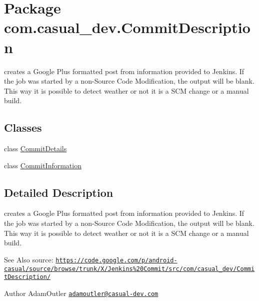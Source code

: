 \hypertarget{namespacecom_1_1casual__dev_1_1_commit_description}{\section{Package com.\-casual\-\_\-dev.\-Commit\-Description}
\label{namespacecom_1_1casual__dev_1_1_commit_description}
}


creates a Google Plus formatted post from information provided to Jenkins. If the job was started by a non-\/\-Source Code Modification, the output will be blank. This way it is possible to detect weather or not it is a S\-C\-M change or a manual build.  


\subsection*{Classes}
\begin{DoxyCompactItemize}
\item 
class \hyperlink{classcom_1_1casual__dev_1_1_commit_description_1_1_commit_details}{Commit\-Details}
\item 
class \hyperlink{classcom_1_1casual__dev_1_1_commit_description_1_1_commit_information}{Commit\-Information}
\end{DoxyCompactItemize}


\subsection{Detailed Description}
creates a Google Plus formatted post from information provided to Jenkins. If the job was started by a non-\/\-Source Code Modification, the output will be blank. This way it is possible to detect weather or not it is a S\-C\-M change or a manual build. \begin{DoxySeeAlso}{See Also}
source\-: \href{https://code.google.com/p/android-casual/source/browse/trunk/X/Jenkins%20Commit/src/com/casual_dev/CommitDescription/}{\tt https\-://code.\-google.\-com/p/android-\/casual/source/browse/trunk/\-X/\-Jenkins\%20\-Commit/src/com/casual\-\_\-dev/\-Commit\-Description/} 
\end{DoxySeeAlso}
\begin{DoxyAuthor}{Author}
Adam\-Outler \href{mailto:adamoutler@casual-dev.com}{\tt adamoutler@casual-\/dev.\-com} 
\end{DoxyAuthor}
